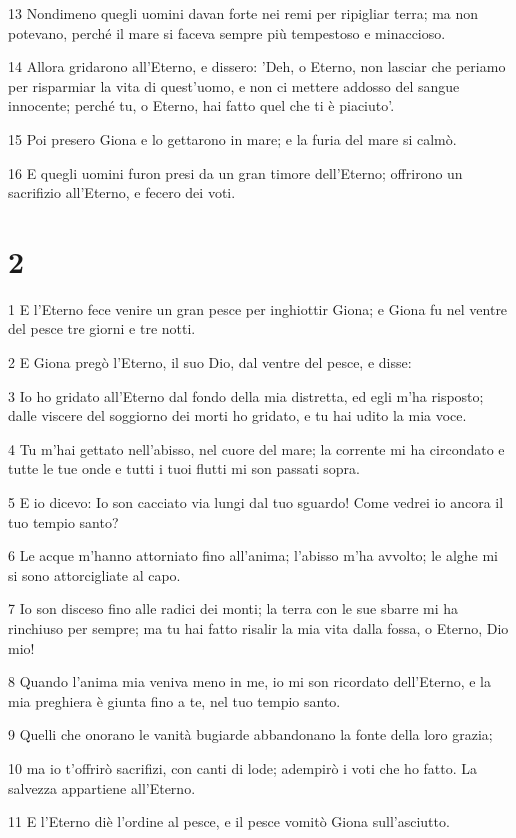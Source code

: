 \par 13 Nondimeno quegli uomini davan forte nei remi per ripigliar terra; ma non potevano, perché il mare si faceva sempre più tempestoso e minaccioso.
\par 14 Allora gridarono all'Eterno, e dissero: 'Deh, o Eterno, non lasciar che periamo per risparmiar la vita di quest'uomo, e non ci mettere addosso del sangue innocente; perché tu, o Eterno, hai fatto quel che ti è piaciuto'.
\par 15 Poi presero Giona e lo gettarono in mare; e la furia del mare si calmò.
\par 16 E quegli uomini furon presi da un gran timore dell'Eterno; offrirono un sacrifizio all'Eterno, e fecero dei voti.

\chapter{2}

\par 1 E l'Eterno fece venire un gran pesce per inghiottir Giona; e Giona fu nel ventre del pesce tre giorni e tre notti.
\par 2 E Giona pregò l'Eterno, il suo Dio, dal ventre del pesce, e disse:
\par 3 Io ho gridato all'Eterno dal fondo della mia distretta, ed egli m'ha risposto; dalle viscere del soggiorno dei morti ho gridato, e tu hai udito la mia voce.
\par 4 Tu m'hai gettato nell'abisso, nel cuore del mare; la corrente mi ha circondato e tutte le tue onde e tutti i tuoi flutti mi son passati sopra.
\par 5 E io dicevo: Io son cacciato via lungi dal tuo sguardo! Come vedrei io ancora il tuo tempio santo?
\par 6 Le acque m'hanno attorniato fino all'anima; l'abisso m'ha avvolto; le alghe mi si sono attorcigliate al capo.
\par 7 Io son disceso fino alle radici dei monti; la terra con le sue sbarre mi ha rinchiuso per sempre; ma tu hai fatto risalir la mia vita dalla fossa, o Eterno, Dio mio!
\par 8 Quando l'anima mia veniva meno in me, io mi son ricordato dell'Eterno, e la mia preghiera è giunta fino a te, nel tuo tempio santo.
\par 9 Quelli che onorano le vanità bugiarde abbandonano la fonte della loro grazia;
\par 10 ma io t'offrirò sacrifizi, con canti di lode; adempirò i voti che ho fatto. La salvezza appartiene all'Eterno.
\par 11 E l'Eterno diè l'ordine al pesce, e il pesce vomitò Giona sull'asciutto.

